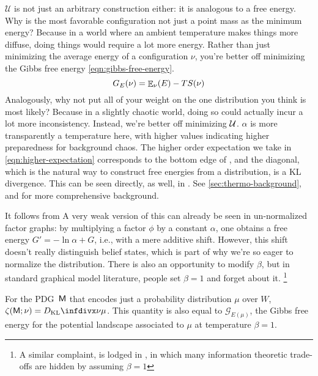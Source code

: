 \documentclass{article}
\newcommand{\sfM}{\mathsf M}
\newcommand{\MN}{PDG}
\numberwithin{equation}{section}
\begin{document}
\begin{notfocus}
 	$\mathcal U$ is not just an arbitrary construction either: it is analogous to a free energy. Why is the most favorable configuration not just a point mass as the minimum energy? Because in a world where an ambient temperature makes things more diffuse, doing things would require a lot more energy. Rather than just minimizing the average energy of a configuration $\nu$, you're better off minimizing the Gibbs free energy \eqref{eqn:gibbs-free-energy}. 
 	\begin{equation}
 		G_E(\nu) = {\mathop{\mathbb E}}_\nu( E )  - T S(\nu) \label{eqn:gibbs-free-energy}
 	\end{equation}
 	Analogously, why not put all of your weight on the one distribution you think is most likely? Because in a slightly chaotic world, doing so could actually incur a lot more inconsistency. Instead, we're better off minimizing $\cal U$. $\alpha$ is more transparently a temperature here, with higher values indicating higher preparedness for background chaos. The higher order expectation we take in \eqref{eqn:higher-expectation} corresponds to the bottom edge of , and the diagonal, which is the natural way to construct free energies from a distribution, is a KL divergence. This can be seen directly, as well, in .
	See \ref{sec:thermo-background}, and \parencite{bethe,friston} for more comprehensive background. %
	
	
	It follows from 
	A very weak version of this can already be seen in un-normalized factor graphs: by multiplying a factor $\phi$ by a constant $\alpha$, one obtains a free energy $G' = - \ln \alpha + G$, i.e., with a mere additive shift. However, this shift doesn't really distinguish belief states, which is part of why we're so eager to normalize the distribution.
	There is also an opportunity to modify $\beta$, but in standard graphical model literature, people set $\beta = 1$ and forget about it.%
		\footnote{A similar complaint, is lodged in \parencite{fixing-broken-elbo}, in which many information theoretic trade-offs are hidden by assuming $\beta = 1$}


	\begin{examplex}[continues=ex:worldsonly]\label{ex:energy-from-distrib}
		For the \MN\ $\sf M$ that encodes just a probability distribution $\mu$ over $W$,  $\zeta(\sfM; \nu) = \kldiv{\nu}{\mu}$. This quantity is also equal to $\mathcal G_{E(\mu)}$, the Gibbs free energy for the potential landscape associated to $\mu$ at temperature $\beta = 1$.
	\end{examplex}



\end{notfocus}
\end{document}
